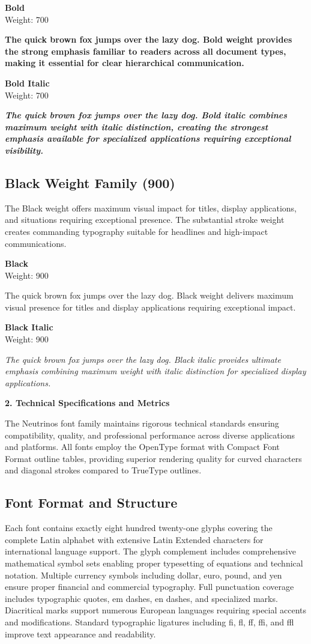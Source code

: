 \documentclass[11pt,letterpaper]{article}
\newcommand{\weightdemo}[3]{%
\noindent
\begin{minipage}{0.25\textwidth}
\textbf{#1}\\
{\small Weight: #2}
\end{minipage}%
\begin{minipage}{0.75\textwidth}
#3
\end{minipage}
\vspace{0.5em}
}
\newcommand{\sectionheader}[1]{%
\vspace{1em}
\noindent
\colorbox{neutrinosblue}{%
\begin{minipage}{\textwidth}
\vspace{0.3em}
{\color{white}\LARGE\textbf{#1}}
\vspace{0.3em}
\end{minipage}}
\vspace{0.5em}
}
\begin{document}
\weightdemo{Bold}{700}{%
\textbf{The quick brown fox jumps over the lazy dog. Bold weight provides the strong emphasis familiar to readers across all document types, making it essential for clear hierarchical communication.}
}

\weightdemo{Bold Italic}{700}{%
\textbf{\textit{The quick brown fox jumps over the lazy dog. Bold italic combines maximum weight with italic distinction, creating the strongest emphasis available for specialized applications requiring exceptional visibility.}}
}

\subsection{Black Weight Family (900)}

The Black weight offers maximum visual impact for titles, display applications, and situations requiring exceptional presence. The substantial stroke weight creates commanding typography suitable for headlines and high-impact communications.

\weightdemo{Black}{900}{%
{\blackfont The quick brown fox jumps over the lazy dog. Black weight delivers maximum visual presence for titles and display applications requiring exceptional impact.}
}

\weightdemo{Black Italic}{900}{%
{\blackfont\itshape The quick brown fox jumps over the lazy dog. Black italic provides ultimate emphasis combining maximum weight with italic distinction for specialized display applications.}
}

\newpage

\sectionheader{2. Technical Specifications and Metrics}

The Neutrinos font family maintains rigorous technical standards ensuring compatibility, quality, and professional performance across diverse applications and platforms. All fonts employ the OpenType format with Compact Font Format outline tables, providing superior rendering quality for curved characters and diagonal strokes compared to TrueType outlines.

\subsection{Font Format and Structure}

Each font contains exactly eight hundred twenty-one glyphs covering the complete Latin alphabet with extensive Latin Extended characters for international language support. The glyph complement includes comprehensive mathematical symbol sets enabling proper typesetting of equations and technical notation. Multiple currency symbols including dollar, euro, pound, and yen ensure proper financial and commercial typography. Full punctuation coverage includes typographic quotes, em dashes, en dashes, and specialized marks. Diacritical marks support numerous European languages requiring special accents and modifications. Standard typographic ligatures including fi, fl, ff, ffi, and ffl improve text appearance and readability.
\end{document}
